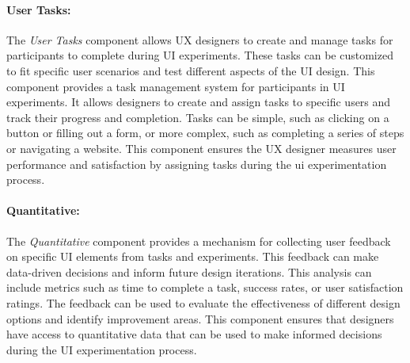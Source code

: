 
\paragraph{User Tasks:}
The \textit{User Tasks} component allows UX designers to create and manage tasks for participants to complete during UI experiments. These tasks can be customized to fit specific user scenarios and test different aspects of the UI design.
This component provides a task management system for participants in UI experiments. 
It allows designers to create and assign tasks to specific users and track their progress and completion. 
Tasks can be simple, such as clicking on a button or filling out a form, or more complex, such as completing a series of steps or navigating a website. 
This component ensures the UX designer measures user performance and satisfaction by assigning tasks during the \ac{ui} experimentation process.

\paragraph{Quantitative:}
The \textit{Quantitative} component provides a mechanism for collecting user feedback on specific UI elements from tasks and experiments. 
This feedback can make data-driven decisions and inform future design iterations.
This analysis can include metrics such as time to complete a task, success rates, or user satisfaction ratings. 
The feedback can be used to evaluate the effectiveness of different design options and identify improvement areas. 
This component ensures that designers have access to quantitative data that can be used to make informed decisions during the UI experimentation process.

